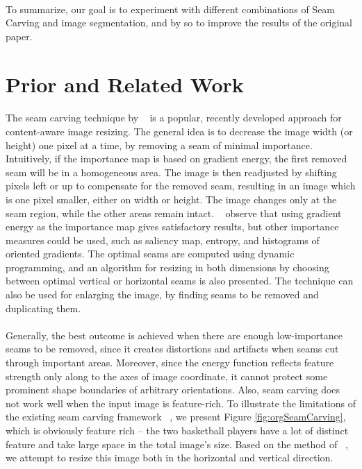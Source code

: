\documentclass[conference]{acmsiggraph}
\begin{document}
\paragraph{}
To summarize, our goal is to experiment with different combinations of Seam Carving and image segmentation, and by so to improve the results of the original paper.


\section{Prior and Related Work}

\paragraph{}
The seam carving technique by ~\cite{Avidan2007} is a popular, recently developed approach for content-aware image resizing. The general idea is to decrease the image width (or height) one pixel at a time,  by removing a seam of minimal importance. Intuitively, if the importance map is based on gradient energy, the first removed seam will be in a homogeneous area. The image is then readjusted by shifting pixels left or up to compensate for the removed seam, resulting in an image which is one pixel smaller, either on width or height. The image changes only at the seam region, while the other areas remain intact. ~\cite{Avidan2007} observe that using gradient energy as the importance map gives satisfactory results, but other importance measures could be used, such as saliency map, entropy, and histograms of oriented gradients. The optimal seams are computed using dynamic programming, and an algorithm for resizing in both dimensions by choosing between optimal vertical or horizontal seams is also presented. The technique can also be used for enlarging the image, by finding seams to be removed and duplicating them. 

\paragraph{}
Generally, the best outcome is achieved when there are enough low-importance seams to be removed, since it creates distortions and artifacts when seams cut through important areas. Moreover, since the energy function reflects feature strength only along to the axes  of image coordinate, it cannot protect some prominent shape boundaries of arbitrary orientations. Also, seam carving does not work well when the input image is feature-rich. To illustrate the limitations of the existing seam carving framework ~\cite{Avidan2007}, we present Figure \ref{fig:orgSeamCarving}, which is obviously feature rich -- the two basketball players have a lot of distinct feature and take large space in the total image's size. Based on the method of ~\cite{Avidan2007}, we attempt to resize this image both in the horizontal and vertical direction.
\end{document}
